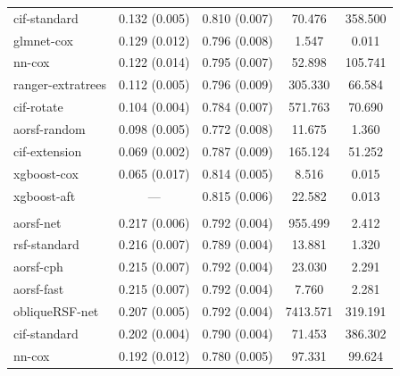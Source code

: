 \documentclass[twoside,11pt]{article}\usepackage[]{graphicx}\usepackage[]{xcolor}
\newenvironment{knitrout}{}{} %
\begin{document}
\begin{knitrout}
\begin{longtable}[t]{lcccc}
\hspace{1em}cif-standard & 0.132 (0.005) & 0.810 (0.007) & 70.476 & 358.500\\
\hspace{1em}glmnet-cox & 0.129 (0.012) & 0.796 (0.008) & 1.547 & 0.011\\
\hspace{1em}nn-cox & 0.122 (0.014) & 0.795 (0.007) & 52.898 & 105.741\\
\hspace{1em}ranger-extratrees & 0.112 (0.005) & 0.796 (0.009) & 305.330 & 66.584\\
\hspace{1em}cif-rotate & 0.104 (0.004) & 0.784 (0.007) & 571.763 & 70.690\\
\hspace{1em}aorsf-random & 0.098 (0.005) & 0.772 (0.008) & 11.675 & 1.360\\
\hspace{1em}cif-extension & 0.069 (0.002) & 0.787 (0.009) & 165.124 & 51.252\\
\hspace{1em}xgboost-cox & 0.065 (0.017) & 0.814 (0.005) & 8.516 & 0.015\\
\hspace{1em}xgboost-aft & --- & 0.815 (0.006) & 22.582 & 0.013\\
\addlinespace[0.3em]
\multicolumn{5}{l}{\textit{\textbf{ARIC; death, n = 13623, p = 41}}}\\
\hline
\hspace{1em}aorsf-net & 0.217 (0.006) & 0.792 (0.004) & 955.499 & 2.412\\
\hspace{1em}rsf-standard & 0.216 (0.007) & 0.789 (0.004) & 13.881 & 1.320\\
\hspace{1em}aorsf-cph & 0.215 (0.007) & 0.792 (0.004) & 23.030 & 2.291\\
\hspace{1em}aorsf-fast & 0.215 (0.007) & 0.792 (0.004) & 7.760 & 2.281\\
\hspace{1em}obliqueRSF-net & 0.207 (0.005) & 0.792 (0.004) & 7413.571 & 319.191\\
\hspace{1em}cif-standard & 0.202 (0.004) & 0.790 (0.004) & 71.453 & 386.302\\
\hspace{1em}nn-cox & 0.192 (0.012) & 0.780 (0.005) & 97.331 & 99.624\\

\end{longtable}
\end{knitrout}
\end{document}
